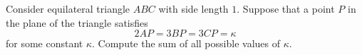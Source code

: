 Consider equilateral triangle $ABC$ with side length $1$. Suppose that a point $P$ in the plane of the triangle satisfies \[2AP=3BP=3CP=\kappa\] for some constant $\kappa$. Compute the sum of all possible values of $\kappa$.